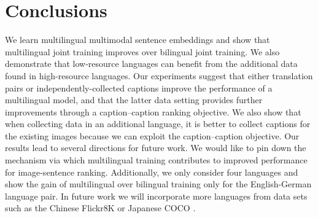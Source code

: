 \section{Conclusions}
We learn multilingual multimodal sentence embeddings and show that multilingual joint training improves over bilingual joint training. We also demonstrate that low-resource languages can benefit from the additional data found in high-resource languages. Our experiments suggest that either translation pairs or independently-collected captions improve the performance of a multilingual model, and that the latter data setting provides further improvements through a caption--caption ranking objective. We also show that when collecting data in an additional language, it is better to collect captions for the existing images because we can exploit the caption--caption objective. Our results lead to several directions for future work. We would like to pin down the mechanism via which multilingual training contributes to improved performance for image-sentence ranking. Additionally, we only consider four languages and show the gain of multilingual over bilingual training only for the English-German language pair. In future work we will incorporate more languages from data sets such as the Chinese Flickr8K \citep{li2016adding} or Japanese COCO \citep{P16-1168}. 

